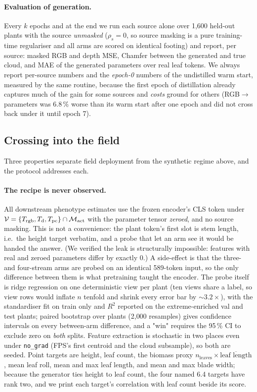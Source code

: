 \paragraph{Evaluation of generation.}
Every $k$ epochs and at the end we run each source alone over 1{,}600 held-out
plants with the source \emph{unmasked} ($\rho_s{=}0$, so source masking is a pure
training-time regulariser and all arms are scored on identical footing) and report,
per source: masked RGB and depth MSE, Chamfer between the generated and true cloud,
and MAE of the generated parameters over real leaf tokens. We always report
per-source numbers and the \emph{epoch-0} numbers of the undistilled warm start,
measured by the same routine, because the first epoch of distillation already
captures much of the gain for some sources and \emph{costs} ground for others
(RGB$\to$parameters was 6.8\,\% worse than its warm start after one epoch and did
not cross back under it until epoch 7).

\subsection{Crossing into the field}
\label{sec:field}

Three properties separate field deployment from the synthetic regime above, and
the protocol addresses each.

\paragraph{The recipe is never observed.}
All downstream phenotype estimates use the frozen encoder's CLS token under
$\mathcal{V}=\{T_{\mathrm{rgb}},T_{\mathrm{d}},T_{\mathrm{pc}}\}\cap\mathcal{M}_{\mathrm{act}}$ with the parameter tensor
\emph{zeroed}, and no source masking. This is not a convenience: the plant token's
first slot is stem length, i.e.\ the height target verbatim, and a probe that let
an arm see it would be handed the answer. (We verified the leak is structurally
impossible: features with real and zeroed parameters differ by exactly 0.) A
side-effect is that the three- and four-stream arms are probed on an identical
589-token input, so the only difference between them is what pretraining taught
the encoder. The probe itself is ridge regression on one deterministic view per
plant (ten views share a label, so view rows would inflate $n$ tenfold and shrink
every error bar by $\sim3.2\times$), with the standardiser fit on train only and
$R^2$ reported on the extreme-enriched val and test plants; paired bootstrap over
plants (2{,}000 resamples) gives confidence intervals on every between-arm
difference, and a "win" requires the 95\,\% CI to exclude zero on \emph{both}
splits. Feature extraction is stochastic in two places even under
\texttt{no\_grad} (FPS's first centroid and the cloud subsample), so both are
seeded. Point targets are height, leaf count, the biomass proxy
$n_{\mathrm{leaves}}\times\overline{\text{leaf length}}$, mean leaf roll, mean and
max leaf length, and mean and max blade width; because the generator ties height
to leaf count, the four named 6.4 targets have rank two, and we print each target's
correlation with leaf count beside its score.

